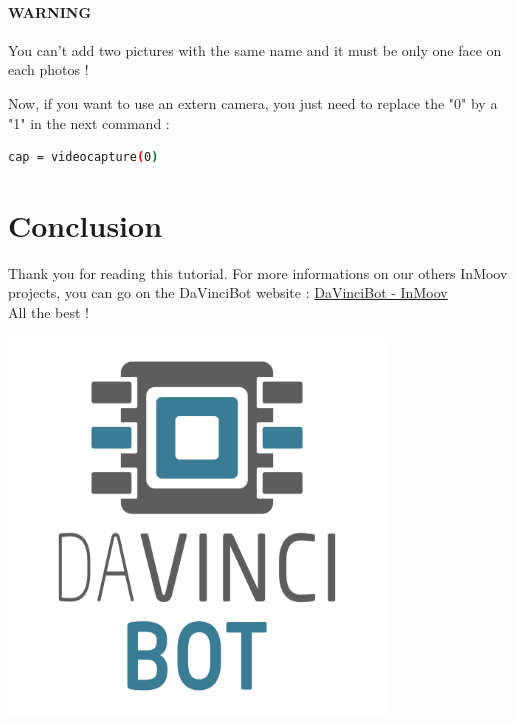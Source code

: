 \documentclass[12pt, oneside]{article}
\begin{document}
\paragraph{WARNING} You can't add two pictures with the same name and it must be only one face on each photos !
\vspace{1cm}

\newpage
Now, if you want to use an extern camera, you just need to replace the "0" by a "1" in the next command :
\begin{lstlisting}[language=bash]
  cap = videocapture(0) 
\end{lstlisting}

\section{Conclusion}
Thank you for reading this tutorial. For more informations on our others InMoov projects, you can go on the DaVinciBot website : \href{http://davincibot.org/inmoov/}{DaVinciBot - InMoov} \\
All the best !

\vspace{2cm}
\begin{center}
	\includegraphics[width = 10cm]{Images/DaVinciBot_Square.png}
\end{center}
\end{document}
